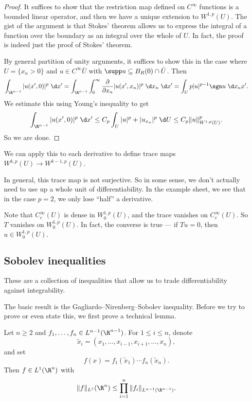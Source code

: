 \documentclass[a4paper]{article}
\begin{document}
\begin{proof}
  It suffices to show that the restriction map defined on $C^\infty$ functions is a bounded linear operator, and then we have a unique extension to $W^{1, p}(U)$. The gist of the argument is that Stokes' theorem allows us to express the integral of a function over the boundary as an integral over the whole of $U$. In fact, the proof is indeed just the proof of Stokes' theorem.

  By general partition of unity arguments, it suffices to show this in the case where $U = \{x_n > 0\}$ and $u \in C^\infty{\bar{U}}$ with $\supp u \subseteq B_R(0) \cap \bar{U}$. Then
  \[
    \int_{\R^{n - 1}} |u(x', 0)|^p \;\d x' = \int_{\R^{n - 1}} \int_0^\infty \frac{\partial}{\partial x_n} |u(x', x_n)|^p \;\d x_n \;\d x' = \int_U p |u|^{p - 1} \sgn u \;\d x_n x'.
  \]
  We estimate this using Young's inequality to get
  \[
    \int_{\R^{n - 1}} |u(x', 0)|^p \;\d x' \leq C_p \int_U |u|^p + |u_{x_n}|^p \;\d U \leq C_p \|u\|_{W^{1, p}(U)}^p.
  \]
  So we are done.
\end{proof}
We can apply this to each derivative to define trace maps $W^{k, p}(U) \to W^{k - 1, p}(U)$.

In general, this trace map is not surjective. So in some sense, we don't actually need to use up a whole unit of differentiability. In the example sheet, we see that in the case $p = 2$, we only lose ``half'' a derivative.

Note that $C_c^\infty(U)$ is dense in $W_0^{1, p}(U)$, and the trace vanishes on $C_c^\infty(U)$. So $T$ vanishes on $W_0^{1, p}(U)$. In fact, the converse is true --- if $Tu = 0$, then $u \in W_0^{1, p}(U)$.

\subsection{Sobolev inequalities}
These are a collection of inequalities that allow us to trade differentiability against integrability.

The basic result is the Gagliardo--Nirenberg--Sobolev inequality. Before we try to prove or even state this, we first prove a technical lemma.
\begin{lemma}
  Let $n \geq 2$ and $f_1, \ldots, f_n \in L^{n - 1}(\R^{n - 1})$. For $1 \leq i \leq n$, denote
  \[
    \tilde{x}_i = (x_1, \ldots, x_{i - 1}, x_{i + 1}, \ldots, x_n),
  \]
  and set
  \[
    f(x) = f_1(\tilde{x}_1) \cdots f_n(\tilde{x}_n).
  \]
  Then $f \in L^1(\R^n)$ with
  \[
    \|f\|_{L^1}(\R^n) \leq \prod_{i = 1}^n \|f_i\|_{L^{n - 1}(\R^{n - 1})}.
  \]
\end{lemma}
\end{document}

